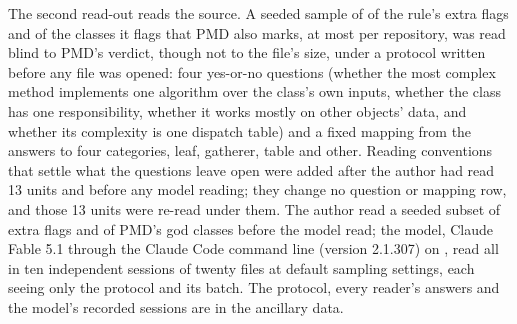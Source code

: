 \documentclass[11pt,a4paper]{article}
\newcommand{\fitwidth}[1]{\resizebox{\ifdim\width>\textwidth\textwidth\else\width\fi}{!}{#1}}
\begin{document}
The second read-out reads the source. A seeded sample of \fpSampleFp{} of the
rule's extra flags and \fpSampleTp{} of the classes it flags that PMD also
marks, at most \fpSamplePerRepo{} per repository, was read blind to PMD's
verdict, though not to the file's size, under a protocol written before any
file was opened: four yes-or-no questions (whether the most complex method
implements one algorithm over the class's own inputs, whether the class has
one responsibility, whether it works mostly on other objects' data, and
whether its complexity is one dispatch table) and a fixed mapping from the
answers to four categories, leaf, gatherer, table and other. Reading
conventions that settle what the questions leave open were added after the
author had read 13 units and before any model reading; they change no
question or mapping row, and those 13 units were re-read under them. The
author read a seeded subset of \fpReadAuthorFpN{} extra flags and
\fpReadAuthorTpN{} of PMD's god classes before the model read; the model,
Claude Fable 5.1 through the Claude Code command line (version 2.1.307) on
\fpModelReadDate{}, read all \fpSampleN{} in ten independent sessions of
twenty files at default sampling settings, each seeing only the protocol and
its batch. The protocol, every reader's answers and the model's recorded
sessions are in the ancillary data.

\begin{table}[t]
\centering
\caption{Exploratory: the blinded reading of \fpSampleFp{} of the relative
rule's extra flags and \fpSampleTp{} of its flags that PMD also marks, by the
author on a seeded subset and by a language model on every unit, each unit's
category given by the protocol's fixed mapping of the four answers. Leaf: one
algorithm, one responsibility, own data. Gatherer: more than one
responsibility, or mostly other objects' data. Table: one dispatch table.}
\label{tab:fp-readings}
\small
\fitwidth{}
\end{table}
\end{document}
